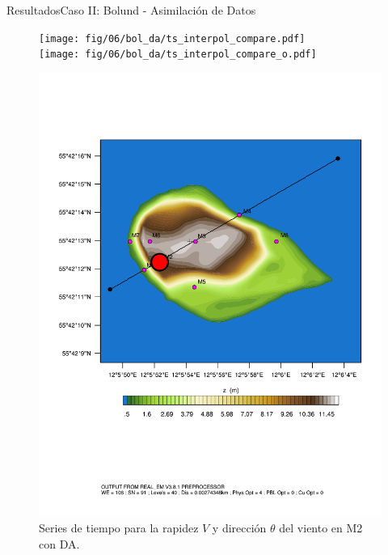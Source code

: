 \documentclass[mathserif,10pt]{beamer}
\begin{document}
\begin{frame}{Resultados}{Caso II: Bolund - Asimilación de Datos}
	\begin{figure}[H]
		\begin{minipage}{0.65\linewidth}
			\texttt{[image: fig/06/bol\_da/ts\_interpol\_compare.pdf]}\\%
			\texttt{[image: fig/06/bol\_da/ts\_interpol\_compare\_o.pdf]}%
		\end{minipage}%
		\begin{minipage}{0.35\linewidth}
			\centering
			\includegraphics[width=1\linewidth,page=1,trim={3.5cm 9.3cm 0.8cm 3.8cm},clip]{fig/05/ppt/bol_control_point2.pdf}%
		\end{minipage}%
		\vspace{-2mm}\caption{Series de tiempo para la rapidez $V$ y dirección $\theta$ del viento en M2 con DA.}
		\label{fig:06_bol_da_ts_m2}
	\end{figure}
\end{frame}
\end{document}
